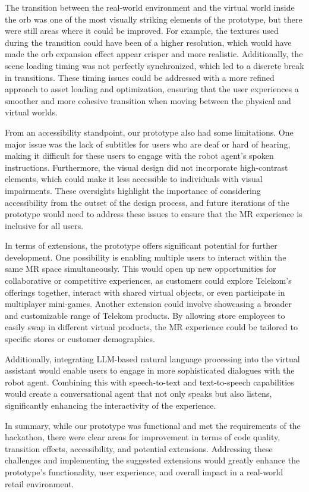 \documentclass[12pt]{article}
\begin{document}
The transition between the real-world environment and the virtual world inside the orb was one of the most visually striking elements of the prototype, but there were still areas where it could be improved. For example, the textures used during the transition could have been of a higher resolution, which would have made the orb expansion effect appear crisper and more realistic. Additionally, the scene loading timing was not perfectly synchronized, which led to a discrete break in transitions. These timing issues could be addressed with a more refined approach to asset loading and optimization, ensuring that the user experiences a smoother and more cohesive transition when moving between the physical and virtual worlds.

From an accessibility standpoint, our prototype also had some limitations. One major issue was the lack of subtitles for users who are deaf or hard of hearing, making it difficult for these users to engage with the robot agent’s spoken instructions. Furthermore, the visual design did not incorporate high-contrast elements, which could make it less accessible to individuals with visual impairments. These oversights highlight the importance of considering accessibility from the outset of the design process, and future iterations of the prototype would need to address these issues to ensure that the MR experience is inclusive for all users.

In terms of extensions, the prototype offers significant potential for further development. One possibility is enabling multiple users to interact within the same MR space simultaneously. This would open up new opportunities for collaborative or competitive experiences, as customers could explore Telekom’s offerings together, interact with shared virtual objects, or even participate in multiplayer mini-games. Another extension could involve showcasing a broader and customizable range of Telekom products. By allowing store employees to easily swap in different virtual products, the MR experience could be tailored to specific stores or customer demographics.

Additionally, integrating LLM-based natural language processing into the virtual assistant would enable users to engage in more sophisticated dialogues with the robot agent. Combining this with speech-to-text and text-to-speech capabilities would create a conversational agent that not only speaks but also listens, significantly enhancing the interactivity of the experience. 

In summary, while our prototype was functional and met the requirements of the hackathon, there were clear areas for improvement in terms of code quality, transition effects, accessibility, and potential extensions. Addressing these challenges and implementing the suggested extensions would greatly enhance the prototype’s functionality, user experience, and overall impact in a real-world retail environment.
\end{document}
